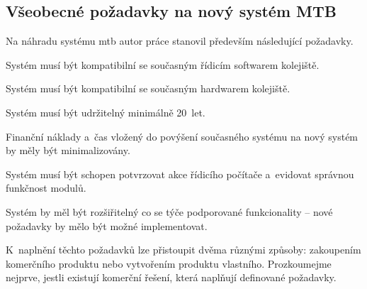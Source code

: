 \subsection{Všeobecné požadavky na nový systém MTB} \label{subsec:gen_requirements}

Na náhradu systému \gls{mtb} autor práce stanovil především následující
požadavky.

\begin{compactenum}
\item Systém musí být kompatibilní se současným řídicím softwarem kolejiště.
\item Systém musí být kompatibilní se současným hardwarem kolejiště.
\item Systém musí být udržitelný minimálně 20~let.
\item Finanční náklady a~čas vložený do povýšení současného systému na nový
	systém by měly být minimalizovány.
\item Systém musí být schopen potvrzovat akce řídicího počítače a~evidovat správnou
	funkčnost modulů.
\item Systém by měl být rozšiřitelný co se týče podporované funkcionality –
	nové požadavky by mělo být možné implementovat.
\end{compactenum}

K~naplnění těchto požadavků lze přistoupit dvěma různými způsoby: zakoupením
komerčního produktu nebo vytvořením produktu vlastního. Prozkoumejme nejprve,
jestli existují komerční řešení, která naplňují definované požadavky.
